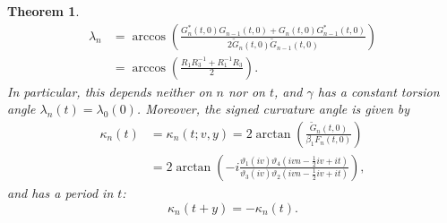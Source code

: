 \documentclass[10pt,leqno]{amsart}
\newtheorem{theorem}{Theorem}[section]
\numberwithin{equation}{section}
\begin{document}
\begin{theorem}
\begin{equation}
\begin{split}
\lambda_n&=\arccos\left(\frac{G_{n}^{*}(t, 0)G_{n-1}(t, 0)+G_{n}(t, 0)G_{n-1}^{*}(t, 0)}{2\widetilde{G}_{n}(t, 0)\widetilde{G}_{n-1}(t, 0)}\right)\\
&=\arccos\left(\frac{R_{1}R_{3}^{-1}+R_{1}^{-1}R_{3}}{2}\right).
\end{split}
\end{equation}
In particular, this depends neither on $n$ nor on $t$,
and $\gamma$ has a constant torsion angle
$\lambda_n(t)=\lambda_0(0)$.
Moreover,
the signed curvature angle is given by
\begin{equation}\label{kappa2}
\begin{split}
\kappa_{n}\left(t\right)&=\kappa_{n}\left(t;v,y\right)=2\arctan\left(\frac{\widetilde{G}_{n}(t, 0)}{\beta_{1} F_{n}(t, 0)}\right)\\
&=2\arctan\left(-i\frac{\vartheta_1(iv)\vartheta_4\left(ivn-\frac{1}{2}iv+it\right)}{\vartheta_3(iv)\vartheta_2\left(ivn-\frac{1}{2}iv+it\right)}\right),
\end{split}
\end{equation}
and has a period in $t$:
\begin{equation}\label{kappa_periodic}
    \kappa_{n}\left(t+y\right)=-\kappa_{n}\left(t\right).
\end{equation}
\end{theorem}
\end{document}
